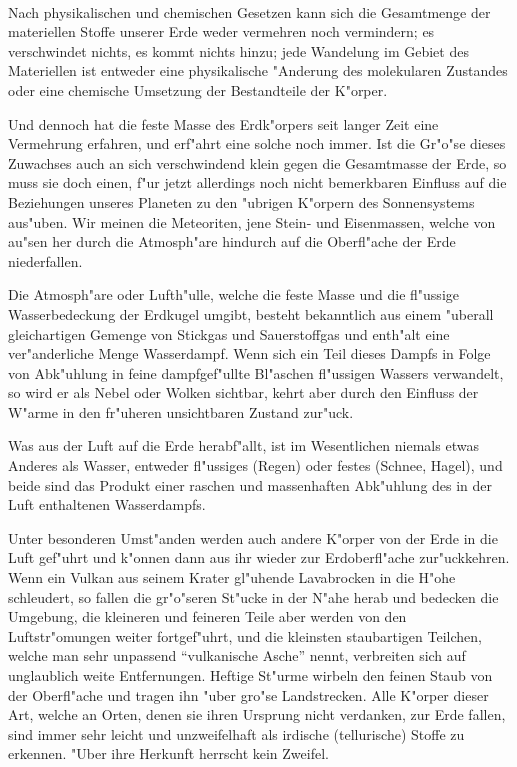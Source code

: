 \documentclass[a4paper, 11pt, oneside, german]{article}
\begin{document}
\paragraph{}
Nach physikalischen und chemischen Gesetzen kann sich die Gesamtmenge der materiellen Stoffe unserer Erde weder vermehren noch vermindern; es verschwindet nichts, es kommt nichts hinzu; jede Wandelung im Gebiet des Materiellen ist entweder eine physikalische "Anderung des molekularen Zustandes oder eine chemische Umsetzung der Bestandteile der K"orper.

Und dennoch hat die feste Masse des Erdk"orpers seit langer Zeit eine Vermehrung erfahren, und erf"ahrt eine solche noch immer. Ist die Gr"o"se dieses Zuwachses auch an sich verschwindend klein gegen die Gesamtmasse der Erde, so muss sie doch einen, f"ur jetzt allerdings noch nicht bemerkbaren Einfluss auf die Beziehungen unseres Planeten zu den "ubrigen K"orpern des Sonnensystems aus"uben. Wir meinen die Meteoriten, jene Stein- und Eisenmassen, welche von au"sen her durch die Atmosph"are hindurch auf die Oberfl"ache der Erde niederfallen.

Die Atmosph"are oder Lufth"ulle, welche die feste Masse und die fl"ussige Wasserbedeckung der Erdkugel umgibt, besteht bekanntlich aus einem "uberall gleichartigen Gemenge von Stickgas und Sauerstoffgas und enth"alt eine ver"anderliche Menge Wasserdampf. Wenn sich ein Teil dieses Dampfs in Folge von Abk"uhlung in feine dampfgef"ullte Bl"aschen fl"ussigen Wassers verwandelt, so wird er als Nebel oder Wolken sichtbar, kehrt aber durch den Einfluss der W"arme in den fr"uheren unsichtbaren Zustand zur"uck.

Was aus der Luft auf die Erde herabf"allt, ist im Wesentlichen niemals etwas Anderes als Wasser, entweder fl"ussiges (Regen) oder festes (Schnee, Hagel), und beide sind das Produkt einer raschen und massenhaften Abk"uhlung des in der Luft enthaltenen Wasserdampfs.

Unter besonderen Umst"anden werden auch andere K"orper von der Erde in die Luft gef"uhrt und k"onnen dann aus ihr wieder zur Erdoberfl"ache zur"uckkehren. Wenn ein Vulkan aus seinem Krater gl"uhende Lavabrocken in die H"ohe schleudert, so fallen die gr"o"seren St"ucke in der N"ahe herab und bedecken die Umgebung, die kleineren und feineren Teile aber werden von den Luftstr"omungen weiter fortgef"uhrt, und die kleinsten staubartigen Teilchen, welche man sehr unpassend "`vulkanische Asche"' nennt, verbreiten sich auf unglaublich weite Entfernungen. Heftige St"urme wirbeln den feinen Staub von der Oberfl"ache und tragen ihn "uber gro"se Landstrecken. Alle K"orper dieser Art, welche an Orten, denen sie ihren Ursprung nicht verdanken, zur Erde fallen, sind immer sehr leicht und unzweifelhaft als irdische (tellurische) Stoffe zu erkennen. "Uber ihre Herkunft herrscht kein Zweifel.
\end{document}
